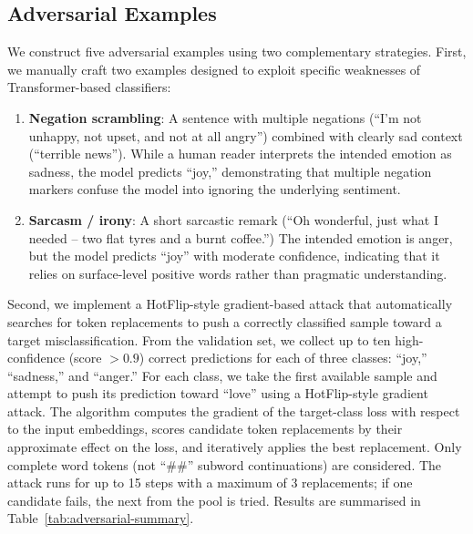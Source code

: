 \documentclass{article}
\begin{document}
\subsection{Adversarial Examples}\label{subsec:adversarial}

We construct five adversarial examples using two complementary strategies.
First, we manually craft two examples designed to exploit specific
weaknesses of Transformer-based classifiers:

\begin{enumerate}
  \item \textbf{Negation scrambling}: A sentence with multiple
    negations (``I'm not unhappy, not upset, and not at all angry'')
    combined with clearly sad context (``terrible news'').  While a
    human reader interprets the intended emotion as sadness, the
    model predicts ``joy,'' demonstrating that multiple negation
    markers confuse the model into ignoring the underlying sentiment.
  \item \textbf{Sarcasm / irony}: A short sarcastic remark
    (``Oh wonderful, just what I needed -- two flat tyres and a
    burnt coffee.'')  The intended emotion is anger, but the model
    predicts ``joy'' with moderate confidence, indicating that it
    relies on surface-level positive words rather than pragmatic
    understanding.
\end{enumerate}

Second, we implement a HotFlip-style gradient-based attack that
automatically searches for token replacements to push a correctly
classified sample toward a target misclassification.  From the
validation set, we collect up to ten high-confidence (score $>0.9$)
correct predictions for each of three classes: ``joy,''
``sadness,'' and ``anger.''  For each class, we take the first
available sample and attempt to push its prediction toward
``love'' using a HotFlip-style gradient attack.  The algorithm
computes the gradient of the target-class loss with respect to the
input embeddings, scores candidate token replacements by their
approximate effect on the loss, and iteratively applies the best
replacement.  Only complete word tokens (not ``\#\#''
subword continuations) are considered.  The attack runs for up to
15 steps with a maximum of 3 replacements; if one candidate fails,
the next from the pool is tried.  Results are summarised in
Table~\ref{tab:adversarial-summary}.
\end{document}
